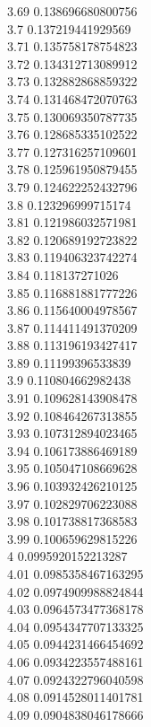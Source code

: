 {3.69	0.138696680800756\\
3.7	0.137219441929569\\
3.71	0.135758178754823\\
3.72	0.134312713089912\\
3.73	0.132882868859322\\
3.74	0.131468472070763\\
3.75	0.130069350787735\\
3.76	0.128685335102522\\
3.77	0.127316257109601\\
3.78	0.125961950879455\\
3.79	0.124622252432796\\
3.8	0.123296999715174\\
3.81	0.121986032571981\\
3.82	0.120689192723822\\
3.83	0.119406323742274\\
3.84	0.118137271026\\
3.85	0.116881881777226\\
3.86	0.115640004978567\\
3.87	0.114411491370209\\
3.88	0.113196193427417\\
3.89	0.11199396533839\\
3.9	0.110804662982438\\
3.91	0.109628143908478\\
3.92	0.108464267313855\\
3.93	0.107312894023465\\
3.94	0.106173886469189\\
3.95	0.105047108669628\\
3.96	0.103932426210125\\
3.97	0.102829706223088\\
3.98	0.101738817368583\\
3.99	0.100659629815226\\
4	0.0995920152213287\\
4.01	0.0985358467163295\\
4.02	0.0974909988824844\\
4.03	0.0964573477368178\\
4.04	0.0954347707133325\\
4.05	0.0944231466454692\\
4.06	0.0934223557488161\\
4.07	0.0924322796040598\\
4.08	0.0914528011401781\\
4.09	0.0904838046178666\\
}

